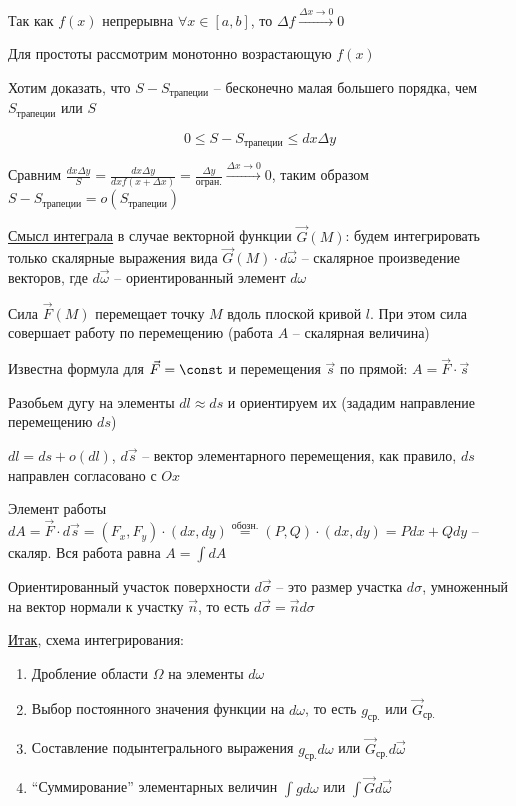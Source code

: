 \documentclass[12pt]{article}
\begin{document}
    Так как $f(x)$ непрерывна $\forall x \in [a, b]$, то $\Delta f \stackrel{\Delta x \to 0}{\rightarrow} 0$

    Для простоты рассмотрим монотонно возрастающую $f(x)$

    Хотим доказать, что $S - S_{\text{трапеции}}$ -- бесконечно малая большего порядка, чем $S_{\text{трапеции}}$ или $S$

    \[0 \leq S - S_{\text{трапеции}} \leq dx \Delta y\]

    Сравним $\frac{dx \Delta y}{S} = \frac{dx \Delta y}{dx f(x + \Delta x)} = \frac{\Delta y}{\text{огран.}} \stackrel{\Delta x \to 0}{\rightarrow} 0$, 
    таким образом $S - S_{\text{трапеции}} = o(S_{\text{трапеции}})$

    \underline{Смысл интеграла} в случае векторной функции $\overrightarrow{G}(M)$: будем интегрировать только скалярные выражения вида $\vec{G}(M) \cdot d\vec{\omega}$ -- скалярное произведение векторов,
    где $d\vec{\omega}$ -- ориентированный элемент $d\omega$

    \Ex Сила $\vec{F}(M)$ перемещает точку $M$ вдоль плоской кривой $l$. При этом сила совершает работу по перемещению
    (работа $A$ -- скалярная величина)

    Известна формула для $\vec{F} = \const$ и перемещения $\vec{s}$ по прямой: $A = \vec{F} \cdot \vec{s}$

    Разобьем дугу на элементы $dl \approx ds$ и ориентируем их (зададим направление перемещению $ds$)

    $dl = ds + o(dl)$, $d\vec{s}$ -- вектор элементарного перемещения, как правило, $ds$ направлен согласовано с $Ox$

    Элемент работы $dA = \vec{F} \cdot d\vec{s} = (F_x, F_y) \cdot (dx, dy) \stackrel{\text{обозн.}}{=}
    (P, Q) \cdot (dx, dy) = Pdx + Qdy$ -- скаляр. Вся работа равна $A = \int dA$

    \Nota Ориентированный участок поверхности $d\vec{\sigma}$ -- это размер участка $d\sigma$, умноженный на вектор нормали к участку $\vec{n}$,
    то есть $d\vec{\sigma} = \vec{n}d\sigma$

    \underline{Итак}, схема интегрирования:

    \begin{enumerate}[label*=\textbf{\arabic**} ]
        \item Дробление области $\Omega$ на элементы $d\omega$

        \item Выбор постоянного значения функции на $d\omega$, то есть $g_{\text{ср.}}$ или $\vec{G}_\text{ср.}$

        \item Составление подынтегрального выражения $g_{\text{ср.}}d\omega$ или $\vec{G}_\text{ср.}d\vec{\omega}$

        \item \enquote{Суммирование} элементарных величин $\int gd\omega$ или $\int \vec{G}d\vec{\omega}$
    \end{enumerate}
\end{document}
